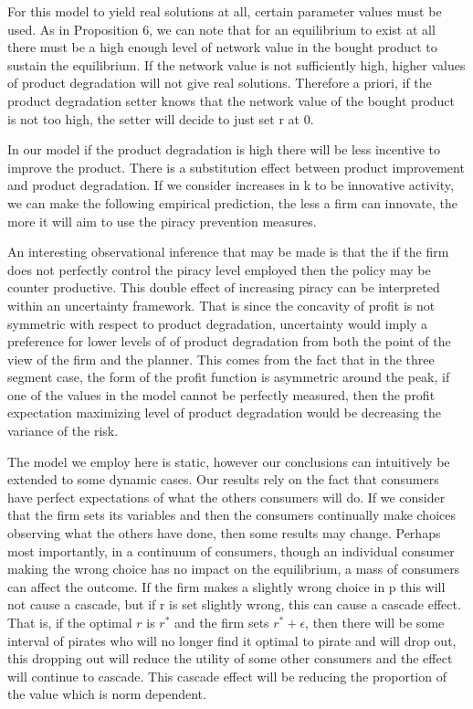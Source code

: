 \documentclass{article}
\begin{document}
For this model to yield real solutions at all, certain parameter values must be used. As in Proposition 6, we can note that for an equilibrium to exist at all there must be a high enough level of network value in the bought product to sustain the equilibrium. If the network value is not sufficiently high, higher values of product degradation will not give real solutions. Therefore a priori, if the product degradation setter knows that the network value of the bought product is not too high, the setter will decide to just set r at 0. 

In our model if the product degradation is high there will be less incentive to improve the product. There is a substitution effect between product improvement and product degradation. If we consider increases in k to be innovative activity, we can make the following empirical prediction, the less a firm can innovate, the more it will aim to use the piracy prevention measures. 

An interesting observational inference that may be made is that the if the firm does not perfectly control the piracy level employed then the policy may be counter productive. This double effect of increasing piracy can be interpreted within an uncertainty framework. That is since the concavity of profit is not symmetric with respect to product degradation, uncertainty would imply a preference for lower levels of of product degradation from both the point of the view of the firm and the planner. This comes from the fact that in the three segment case, the form of the profit function is asymmetric around the peak, if one of the values in the model cannot be perfectly measured, then the profit expectation maximizing level of product degradation would be decreasing the variance of the risk.

The model we employ here is static, however our conclusions can intuitively be extended to some dynamic cases. Our results rely on the fact that consumers have perfect expectations of what the others consumers will do. If we consider that the firm sets its variables and then the consumers continually make choices observing what the others have done, then some results may change. Perhaps most importantly, in a continuum of consumers, though an individual consumer making the wrong choice has no impact on the equilibrium, a mass of consumers can affect the outcome. If the firm makes a slightly wrong choice in p this will not cause a cascade, but if r is set slightly wrong, this can cause a cascade effect. That is, if the optimal $r$ is $r^*$ and the firm sets $r^*+\epsilon$, then there will be some interval of pirates who will no longer find it optimal to pirate and will drop out, this dropping out will reduce the utility of some other consumers and the effect will continue to cascade. This cascade effect will be reducing the proportion of the value which is norm dependent. 
\end{document}
